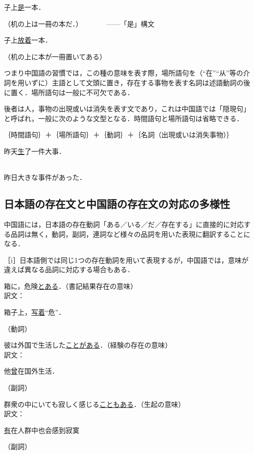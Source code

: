 \documentclass[japanese]{jnlp_1.4}
\newcommand{\inHRei}[1]{}
\begin{document}
\inHRei{(7)}
\begin{簡体中文}子上\ul{是}一本．\end{簡体中文}（机の上は一冊の本だ．）　　　　——「是」構文

\inHRei{(8)}
\begin{簡体中文}子上\ul{放着}一本．\end{簡体中文}（机の上に本が一冊置いてある）

つまり中国語の習慣では，この種の意味を表す際，場所語句を（``在''``从''等の介詞を用いずに）主語として文頭に置き，存在する事物を表す名詞は述語動詞の後に置く．場所語句は一般に不可欠である．

後者は人，事物の出現或いは消失を表す文であり，これは中国語では「隠現句」と呼ばれ，一般に次のような文型となる．時間語句と場所語句は省略できる．

｛時間語句｝＋｛場所語句｝＋｛動詞｝＋｛名詞（出現或いは消失事物）｝

\inHRei{(9)}
\begin{簡体中文}昨天\ul{\mbox{生}}了一件大事．\end{簡体中文}\\
昨日大きな事件があった．


\subsection{日本語の存在文と中国語の存在文の対応の多様性}

中国語には，日本語の存在動詞「ある／いる／だ／存在する」に直接的に対応する品詞は無く，動詞，副詞，連詞など様々の品詞を用いた表現に翻訳することになる．

\noindent
［i］日本語側では同じ1つの存在動詞を用いて表現するが，中国語では，意味が違えば異なる品詞に対応する場合もある．

\inHRei{(13)}
箱に，危険\ul{とある}．\hfill （書記結果存在の意味）\\
訳文：\begin{簡体中文}箱子上，\ul{写着}``危''．\end{簡体中文}\hfill （動詞）

\inHRei{(14)}
彼は外国で生活した\ul{ことがある}．\hfill （経験の存在の意味）\\
訳文：\begin{簡体中文}他\ul{曾\mbox{}}在国外生活．\end{簡体中文}\hfill （副詞）

\inHRei{(15)}
群衆の中にいても寂しく感じる\ul{こともある}．\hfill （生起の意味）\\
訳文：\begin{簡体中文}\ul{有\mbox{}}在人群中也会感到寂寞\end{簡体中文}\hfill （副詞）
\end{document}
